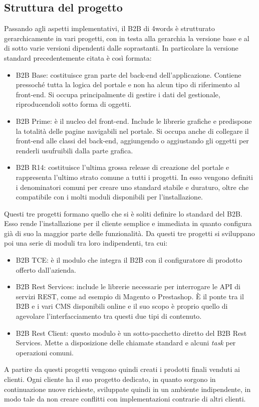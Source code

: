 \subsection{Struttura del progetto}
Passando agli aspetti implementativi, il B2B di 4words è strutturato gerarchicamente in vari progetti, con in testa alla gerarchia la versione base e al di sotto varie versioni dipendenti dalle soprastanti. In particolare la versione standard precedentemente citata è così formata:
\begin{itemize}
	\item B2B Base: costituisce gran parte del back-end dell'applicazione. Contiene pressoché tutta la logica del portale e non ha alcun tipo di riferimento al front-end. Si occupa principalmente di gestire i dati del gestionale, riproducendoli sotto forma di oggetti.
	\item B2B Prime: è il nucleo del front-end. Include le librerie grafiche e predispone la totalità delle pagine navigabili nel portale. Si occupa anche di collegare il front-end alle classi del back-end, aggiungendo o aggiustando gli oggetti per renderli usufruibili dalla parte grafica.
	\item B2B R14: costituisce l'ultima grossa release di creazione del portale e rappresenta l'ultimo strato comune a tutti i progetti. In esso vengono definiti i denominatori comuni per creare uno standard stabile e duraturo, oltre che compatibile con i molti moduli disponibili per l'installazione.
\end{itemize}
Questi tre progetti formano quello che si è soliti definire lo standard del B2B. Esso rende l'installazione per il cliente semplice e immediata in quanto configura già di suo la maggior parte delle funzionalità.
Da questi tre progetti si sviluppano poi una serie di moduli tra loro indipendenti, tra cui:
\begin{itemize}
	\item B2B TCE: è il modulo che integra il B2B con il configuratore di prodotto offerto dall'azienda.
	\item B2B Rest Services: include le librerie necessarie per interrogare le \Gls{API} di servizi \Gls{REST}, come ad esempio di \Gls{Magento} o \Gls{Prestashop}. È il ponte tra il B2B e i vari \Gls{CMS} disponibili online e il suo scopo è proprio quello di agevolare l'interfacciamento tra questi due tipi di contenuto.
	\item B2B Rest Client: questo modulo è un sotto-pacchetto diretto del B2B Rest Services. Mette a disposizione delle chiamate standard e alcuni \textit{task} per operazioni comuni.
\end{itemize}
A partire da questi progetti vengono quindi creati i prodotti finali venduti ai clienti. Ogni cliente ha il suo progetto dedicato, in quanto sorgono in continuazione nuove richieste, sviluppate quindi in un ambiente indipendente, in modo tale da non creare conflitti con implementazioni contrarie di altri clienti.

